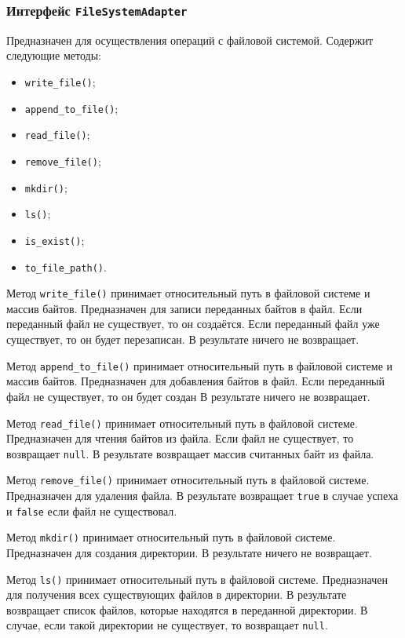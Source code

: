 \subsubsection{Интерфейс \texttt{FileSystemAdapter}}
Предназначен для осуществления операций с файловой системой.
Содержит следующие методы:
\begin{itemize}
    \item \texttt{write\_file()};
    \item \texttt{append\_to\_file()};
    \item \texttt{read\_file()};
    \item \texttt{remove\_file()};
    \item \texttt{mkdir()};
    \item \texttt{ls()};
    \item \texttt{is\_exist()};
    \item \texttt{to\_file\_path()}.
\end{itemize}

Метод \texttt{write\_file()} принимает относительный путь в файловой системе и массив байтов.
Предназначен для записи переданных байтов в файл.
Если переданный файл не существует, то он создаётся.
Если переданный файл уже существует, то он будет перезаписан.
В результате ничего не возвращает.

Метод \texttt{append\_to\_file()} принимает относительный путь в файловой системе и массив байтов.
Предназначен для добавления байтов в файл.
Если переданный файл не существует, то он будет создан
В результате ничего не возвращает.

Метод \texttt{read\_file()} принимает относительный путь в файловой системе.
Предназначен для чтения байтов из файла.
Если файл не существует, то возвращает \texttt{null}.
В результате возвращает массив считанных байт из файла.

Метод \texttt{remove\_file()} принимает относительный путь в файловой системе.
Предназначен для удаления файла.
В результате возвращает \texttt{true} в случае успеха и \texttt{false} если файл не существовал.

Метод \texttt{mkdir()} принимает относительный путь в файловой системе.
Предназначен для создания директории. 
В результате ничего не возвращает.

Метод \texttt{ls()} принимает относительный путь в файловой системе.
Предназначен для получения всех существующих файлов в директории.
В результате возвращает список файлов, которые находятся в переданной директории.
В случае, если такой директории не существует, то возвращает \texttt{null}.

